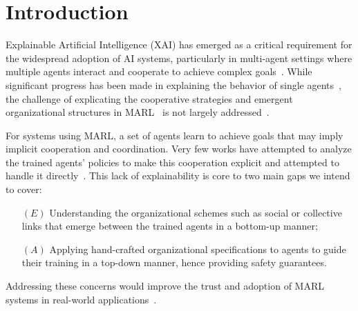 \documentclass[runningheads]{llncs}
\begin{document}





\section{Introduction}

Explainable Artificial Intelligence (XAI) has emerged as a critical requirement for the widespread adoption of AI systems, particularly in multi-agent settings where multiple agents interact and cooperate to achieve complex goals~\cite{doshivelez2017rigorous,gunning2019xai}. While significant progress has been made in explaining the behavior of single agents~\cite{ribeiro2016classifier,lundberg2017unified}, the challenge of explicating the cooperative strategies and emergent organizational structures in MARL~\cite{busoniu2008survey} is not largely addressed~\cite{kok2006collaborative,omidshafiei2019learning}.

For systems using MARL, a set of agents learn to achieve goals that may imply implicit cooperation and coordination. Very few works have attempted to analyze the trained agents' policies to make this cooperation explicit and attempted to handle it directly~\cite{albrecht2018survey,perolat2017pool}. This lack of explainability is core to two main gaps we intend to cover:
%
\begin{itemize}[wide, labelsep = 1em]
    \item[$(E)$] Understanding the organizational schemes such as social or collective links that emerge between the trained agents in a bottom-up manner;
    \item[$(A)$] Applying hand-crafted organizational specifications to agents to guide their training in a top-down manner, hence providing safety guarantees.
\end{itemize}
%
Addressing these concerns would improve the trust and adoption of MARL systems in real-world applications~\cite{kok2006collaborative,omidshafiei2019learning}.
\end{document}
